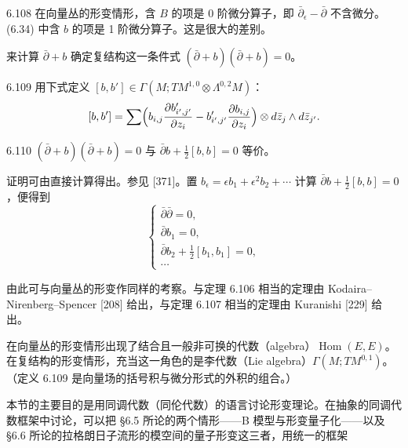 \begin{remark}{6.108}
  在向量丛的形变情形，含 $B$ 的项是 0 阶微分算子，即 $\bar\partial_\epsilon-\bar\partial$ 不含微分。(6.34) 中含 $b$ 的项是 1 阶微分算子。这是很大的差别。
\end{remark}

来计算 $\bar\partial+b$ 确定复结构这一条件式 $(\bar\partial+b)(\bar\partial+b)=0$。

\begin{definition}{6.109}
  用下式定义 $[b,b']\in\Gamma(M;TM^{1,0}\otimes\Lambda^{0,2}M)$：
  \[
    [b,b']=\sum\Bigl(b_{i,j}\frac{\partial b'_{i',j'}}{\partial z_i}
    -b'_{i',j'}\frac{\partial b_{i,j}}{\partial z_i}\Bigr)\otimes d\bar z_j\wedge d\bar z_{j'}.
  \]
\end{definition}

\begin{lemma}{6.110}
  $(\bar\partial+b)(\bar\partial+b)=0$ 与 $\bar\partial b+\frac{1}{2}[b,b]=0$ 等价。
\end{lemma}

证明可由直接计算得出。参见 [371]。置 $b_\epsilon=\epsilon b_1+\epsilon^2b_2+\cdots$ 计算 $\bar\partial b+\frac{1}{2}[b,b]=0$，便得到
\begin{equation}
  \begin{cases}
    \bar\partial\bar\partial=0,\\
    \bar\partial b_1=0,\\
    \bar\partial b_2+\tfrac{1}{2}[b_1,b_1]=0,\\
    \cdots
  \end{cases} \tag{6.35}
\end{equation}

由此可与向量丛的形变作同样的考察。与定理 6.106 相当的定理由 Kodaira–Nirenberg–Spencer [208] 给出，与定理 6.107 相当的定理由 Kuranishi [229] 给出。

在向量丛的形变情形出现了结合且一般非可换的代数（algebra）$\operatorname{Hom}(E,E)$。在复结构的形变情形，充当这一角色的是李代数（Lie algebra）$\Gamma(M;TM^{0,1})$。（定义 6.109 是向量场的括号积与微分形式的外积的组合。）

本节的主要目的是用同调代数（同伦代数）的语言讨论形变理论。在抽象的同调代数框架中讨论，可以把 §6.5 所论的两个情形——B 模型与形变量子化——以及 §6.6 所论的拉格朗日子流形的模空间的量子形变这三者，用统一的框架

